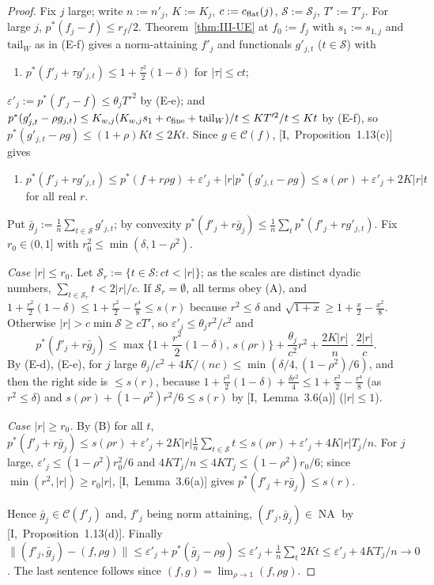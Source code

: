 \documentclass[10pt]{amsart}
\theoremstyle{definition}
\theoremstyle{remark}
\newcommand{\NA}{\operatorname{NA}}
\newcommand{\Cset}{\mathcal C}
\begin{document}
\begin{proof}
Fix $j$ large; write $n:=n'_j$, $K:=K_j$, $c:=c_{\rm flat}(j)$,
$\mathcal S:=\mathcal S_j$, $T':=T'_j$.  For large $j$, $p^*(f_j-f)\le r_f/2$.
Theorem~\ref{thm:III-UE} at $f_0:=f_j$ with $s_1:=s_{1,j}$ and $\mathrm{tail}_W$
as in (E-f) gives a norm-attaining $f'_j$ and functionals $g'_{j,t}$
($t\in\mathcal S$) with
\begin{enumerate}
\item[(A)] $p^*(f'_j+\tau g'_{j,t})\le1+\frac{\tau^2}2(1-\delta)$ for $|\tau|\le ct$;
\end{enumerate}
$\varepsilon'_j:=p^*(f'_j-f)\le\theta_jT'^2$ by (E-e); and $p^*(g'_{j,t}-\rho
g_{j,t})\le K_{w,j}(K_{w,j}s_1+c_{\rm fine}+\mathrm{tail}_W)/t\le KT'^2/t\le Kt$ by
(E-f), so $p^*(g'_{j,t}-\rho g)\le(1+\rho)Kt\le2Kt$.  Since $g\in\Cset(f)$,
[I,~Proposition~1.13(c)] gives
\begin{enumerate}
\item[(B)] $p^*(f'_j+rg'_{j,t})\le p^*(f+r\rho g)+\varepsilon'_j+|r|p^*(g'_{j,t}-\rho g)
\le s(\rho r)+\varepsilon'_j+2K|r|t$ for all real $r$.
\end{enumerate}
Put $\bar g_j:=\frac1n\sum_{t\in\mathcal S}g'_{j,t}$; by convexity
$p^*(f'_j+r\bar g_j)\le\frac1n\sum_tp^*(f'_j+rg'_{j,t})$.  Fix $r_0\in(0,1]$ with
$r_0^2\le\min(\delta,1-\rho^2)$.

\emph{Case $|r|\le r_0$.}  Let $\mathcal S_r:=\{t\in\mathcal S:ct<|r|\}$; as the
scales are distinct dyadic numbers, $\sum_{t\in\mathcal S_r}t<2|r|/c$.  If
$\mathcal S_r=\emptyset$, all terms obey (A), and $1+\frac{r^2}2(1-\delta)\le1+
\frac{r^2}2-\frac{r^4}8\le s(r)$ because $r^2\le\delta$ and $\sqrt{1+x}\ge1+
\frac x2-\frac{x^2}8$.  Otherwise $|r|>c\min\mathcal S\ge cT'$, so $\varepsilon'_j\le\theta_jr^2/c^2$
and
\[
 p^*(f'_j+r\bar g_j)\le\max\Big\{1+\frac{r^2}2(1-\delta),\,s(\rho r)\Big\}
 +\frac{\theta_j}{c^2}r^2+\frac{2K|r|}n\cdot\frac{2|r|}c .
\]
By (E-d), (E-e), for $j$ large $\theta_j/c^2+4K/(nc)\le\min(\delta/4,(1-\rho^2)/6)$,
and then the right side is $\le s(r)$, because $1+\frac{r^2}2(1-\delta)+
\frac{\delta r^2}4\le1+\frac{r^2}2-\frac{r^4}8$ (as $r^2\le\delta$) and
$s(\rho r)+(1-\rho^2)r^2/6\le s(r)$ by [I,~Lemma~3.6(a)] ($|r|\le1$).

\emph{Case $|r|\ge r_0$.}  By (B) for all $t$, $p^*(f'_j+r\bar g_j)\le s(\rho r)+
\varepsilon'_j+2K|r|\frac1n\sum_{t\in\mathcal S}t\le s(\rho r)+\varepsilon'_j+
4K|r|T_j/n$.  For $j$ large, $\varepsilon'_j\le(1-\rho^2)r_0^2/6$ and
$4KT_j/n\le4KT_j\le(1-\rho^2)r_0/6$; since $\min(r^2,|r|)\ge r_0|r|$,
[I,~Lemma~3.6(a)] gives $p^*(f'_j+r\bar g_j)\le s(r)$.

Hence $\bar g_j\in\Cset(f'_j)$ and, $f'_j$ being norm attaining,
$(f'_j,\bar g_j)\in\NA$ by [I,~Proposition~1.13(d)].  Finally
$\|(f'_j,\bar g_j)-(f,\rho g)\|\le\varepsilon'_j+p^*(\bar g_j-\rho g)\le
\varepsilon'_j+\frac1n\sum_t2Kt\le\varepsilon'_j+4KT_j/n\to0$.  The last sentence
follows since $(f,g)=\lim_{\rho\to1}(f,\rho g)$.
\end{proof}
\end{document}
